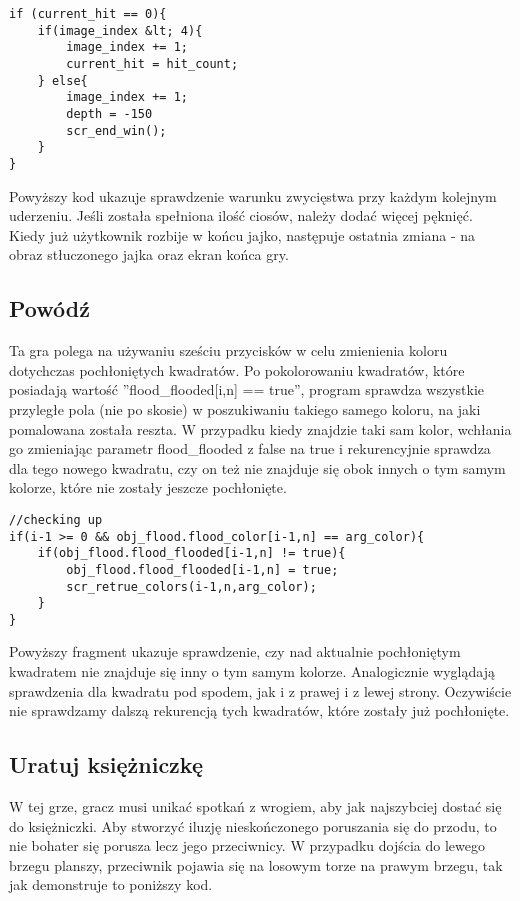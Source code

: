 \documentclass[openright]{xmgr}
\begin{document}
\begin{lstlisting}[caption={Fragment  kodu obiektu obj\_egg}]
if (current_hit == 0){
    if(image_index &lt; 4){
        image_index += 1;
        current_hit = hit_count;
    } else{
        image_index += 1;
        depth = -150
        scr_end_win();
    }
}
\end{lstlisting}

Powyższy kod ukazuje sprawdzenie warunku zwycięstwa przy każdym kolejnym
uderzeniu. Jeśli została spełniona ilość ciosów, należy dodać więcej pęknięć. Kiedy już użytkownik rozbije w końcu jajko, następuje ostatnia zmiana - na obraz stłuczonego jajka oraz ekran końca gry.

\subsection{Powódź}
Ta gra polega na używaniu sześciu przycisków w celu zmienienia koloru dotychczas
pochłoniętych kwadratów. Po pokolorowaniu kwadratów, które posiadają wartość ”flood\_flooded[i,n] == true”, program sprawdza wszystkie przyległe pola (nie po skosie) w poszukiwaniu takiego samego koloru, na jaki pomalowana została reszta. W przypadku kiedy znajdzie taki sam kolor, wchłania go zmieniając parametr flood\_flooded z false na true i rekurencyjnie sprawdza dla tego nowego kwadratu, czy on też nie znajduje się obok innych o tym samym kolorze, które nie zostały jeszcze pochłonięte. 


\begin{lstlisting}[caption={Fragment  skryptu scr\_retrue\_colors}]
//checking up
if(i-1 >= 0 && obj_flood.flood_color[i-1,n] == arg_color){
    if(obj_flood.flood_flooded[i-1,n] != true){     
        obj_flood.flood_flooded[i-1,n] = true;
        scr_retrue_colors(i-1,n,arg_color);
    }   
}
\end{lstlisting}

Powyższy fragment ukazuje sprawdzenie, czy nad aktualnie pochłoniętym kwadratem nie znajduje się inny o tym samym kolorze. Analogicznie wyglądają
sprawdzenia dla kwadratu pod spodem, jak i z prawej i z lewej strony. Oczywiście nie sprawdzamy dalszą rekurencją tych kwadratów, które zostały już pochłonięte.

\subsection{Uratuj księżniczkę}
W tej grze, gracz musi unikać spotkań z wrogiem, aby jak najszybciej dostać się do księżniczki. Aby stworzyć iluzję nieskończonego poruszania się do przodu, to nie bohater się porusza lecz jego przeciwnicy. W przypadku dojścia do lewego brzegu planszy, przeciwnik pojawia się na losowym torze na prawym brzegu, tak jak demonstruje to poniższy kod. 
\end{document}
